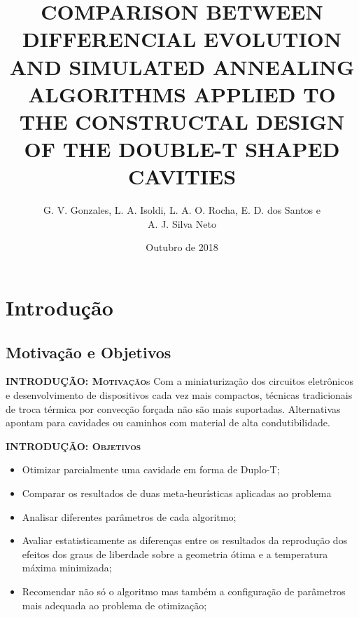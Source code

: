 \documentclass[xcolor=dvipsnames,10pt]{beamer}
\title{\textbf{\small COMPARISON BETWEEN DIFFERENCIAL EVOLUTION AND SIMULATED ANNEALING ALGORITHMS APPLIED TO THE CONSTRUCTAL DESIGN OF THE DOUBLE-T SHAPED CAVITIES
}}
\author{\small G. V. Gonzales,  L. A. Isoldi, L. A. O. Rocha, E. D. dos Santos e \\
A. J. Silva Neto}
\institute{\vspace{-0.3cm}\scriptsize Programa de Pós-Graduação em Modelagem Computacional - FURG}
\date{\vspace{-0.8cm}\scriptsize Outubro de 2018}
\begin{document}
\frame{\titlepage}
\frame{\tableofcontents}

\section{Introdução}
\subsection{Motivação e Objetivos}
\begin{frame}{}
	\begin{block}{\textbf{\textsc{INTRODUÇÃO: Motivação}}}s
	Com a miniaturização dos circuitos eletrônicos e desenvolvimento de dispositivos cada vez mais compactos, técnicas tradicionais de troca térmica por convecção forçada não são mais suportadas. Alternativas apontam para cavidades ou caminhos com material de alta condutibilidade.
	\end{block}
\end{frame}
\begin{frame}{}
	\begin{block}{\textbf{\textsc{INTRODUÇÃO: Objetivos}}}
		\begin{itemize}
		\item Otimizar parcialmente uma cavidade em forma de Duplo-T;
		\item Comparar os resultados de duas meta-heurísticas aplicadas ao problema
		\item Analisar diferentes parâmetros de cada algoritmo;
		\item Avaliar estatisticamente as diferenças entre os resultados da reprodução dos efeitos dos graus de liberdade sobre a geometria ótima e a temperatura máxima minimizada;
		\item Recomendar não só o algoritmo mas também a configuração de parâmetros mais adequada ao problema de otimização;
	\end{itemize}
	\end{block}
\end{frame}
\end{document}
